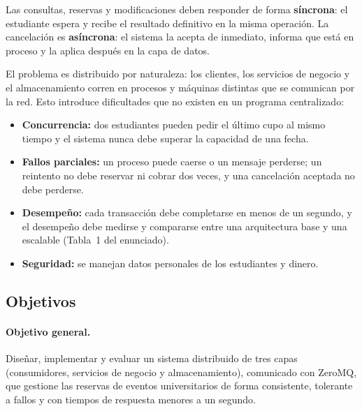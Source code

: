 Las consultas, reservas y modificaciones deben responder de forma \textbf{síncrona}:
el estudiante espera y recibe el resultado definitivo en la misma operación. La
cancelación es \textbf{asíncrona}: el sistema la acepta de inmediato, informa que
está en proceso y la aplica después en la capa de datos.

El problema es distribuido por naturaleza: los clientes, los servicios de negocio y
el almacenamiento corren en procesos y máquinas distintas que se comunican por la
red. Esto introduce dificultades que no existen en un programa centralizado:
\begin{itemize}
    \item \textbf{Concurrencia:} dos estudiantes pueden pedir el último cupo al mismo
          tiempo y el sistema nunca debe superar la capacidad de una fecha.
    \item \textbf{Fallos parciales:} un proceso puede caerse o un mensaje perderse; un
          reintento no debe reservar ni cobrar dos veces, y una cancelación aceptada no
          debe perderse.
    \item \textbf{Desempeño:} cada transacción debe completarse en menos de un segundo,
          y el desempeño debe medirse y compararse entre una arquitectura base y una
          escalable (Tabla~1 del enunciado).
    \item \textbf{Seguridad:} se manejan datos personales de los estudiantes y dinero.
\end{itemize}

\subsection{Objetivos}

\paragraph{Objetivo general.} Diseñar, implementar y evaluar un sistema distribuido
de tres capas (consumidores, servicios de negocio y almacenamiento), comunicado con
ZeroMQ, que gestione las reservas de eventos universitarios de forma consistente,
tolerante a fallos y con tiempos de respuesta menores a un segundo.

